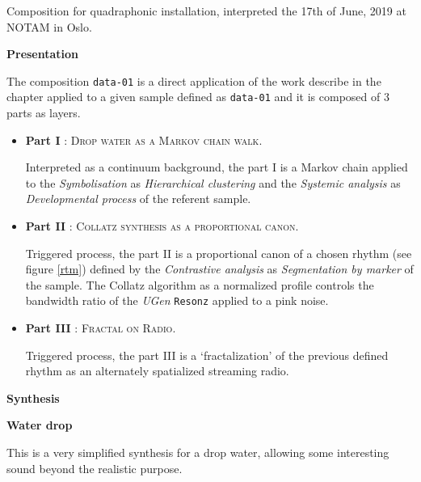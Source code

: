 \bigskip

Composition for quadraphonic installation, interpreted the 17th of June, 2019 at NOTAM in Oslo.

\bigskip

\noindent \textbf{{\large Presentation}}
\hrulefill

\bigskip

The composition \texttt{data-01} is a direct application of the work describe in the chapter \textsl{} applied to a given sample defined as \texttt{data-01} and it is composed of 3 parts as layers.

\begin{itemize}[leftmargin=0.4in]
\item \textbf{Part I} : \textsc{Drop water as a Markov chain walk}. 

Interpreted as a continuum background, the part I is a Markov chain applied to the \textsl{Symbolisation} as \textsl{Hierarchical clustering} and the \textsl{Systemic analysis} as \textsl{Developmental process} of the referent sample.

\item \textbf{Part II} : \textsc{Collatz synthesis as a proportional canon}. 

Triggered process, the part II is a proportional canon of a chosen rhythm (see figure \ref{rtm}) defined by the \textsl{Contrastive analysis} as \textsl{Segmentation by marker} of the sample. The Collatz algorithm as a normalized profile controls the bandwidth ratio of the \textsl{UGen} \texttt{Resonz} applied to a pink noise.

\item \textbf{Part III} : \textsc{Fractal on Radio}. 

Triggered process, the part III is a `fractalization' of the previous defined rhythm as an alternately spatialized streaming radio.

 \end{itemize}

\smallskip

\noindent \textbf{{\large Synthesis}}
\hrulefill

\bigskip

\noindent  \textbf{
  Water drop }
  
\label{wd}

\smallskip

This is a very simplified synthesis for a drop water, allowing some interesting sound beyond the realistic purpose.

